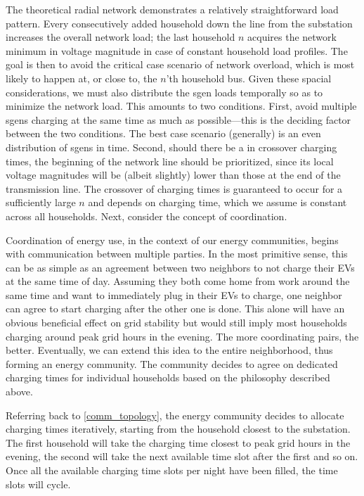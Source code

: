 \documentclass[a4paper,10pt]{report}
\begin{document}
The theoretical radial network demonstrates a relatively straightforward load pattern. Every consecutively added household down the line from the substation increases the overall network load; the last household $n$ acquires the network minimum in voltage magnitude in case of constant household load profiles. The goal is then to avoid the critical case scenario of network overload, which is most likely to happen at, or close to, the $n$'th household bus. Given these spacial considerations, we must also distribute the sgen loads temporally so as to minimize the network load. This amounts to two conditions. First, avoid multiple sgens charging at the same time as much as possible---this is the deciding factor between the two conditions. The best case scenario (generally) is an even distribution of sgens in time. Second, should there be a in crossover charging times, the beginning of the network line should be prioritized, since its local voltage magnitudes will be (albeit slightly) lower than those at the end of the transmission line. The crossover of charging times is guaranteed to occur for a sufficiently large $n$ and depends on charging time, which we assume is constant across all households. Next, consider the concept of coordination.

Coordination of energy use, in the context of our energy communities, begins with communication between multiple parties. In the most primitive sense, this can be as simple as an agreement between two neighbors to not charge their EVs at the same time of day. Assuming they both come home from work around the same time and want to immediately plug in their EVs to charge, one neighbor can agree to start charging after the other one is done. This alone will have an obvious beneficial effect on grid stability but would still imply most households charging around peak grid hours in the evening. The more coordinating pairs, the better. Eventually, we can extend this idea to the entire neighborhood, thus forming an energy community. The community decides to agree on dedicated charging times for individual households based on the philosophy described above.

Referring back to \cref{comm_topology}, the energy community decides to allocate charging times iteratively, starting from the household closest to the substation. The first household will take the charging time closest to peak grid hours in the evening, the second will take the next available time slot after the first and so on. Once all the available charging time slots per night have been filled, the time slots will cycle.
\end{document}
